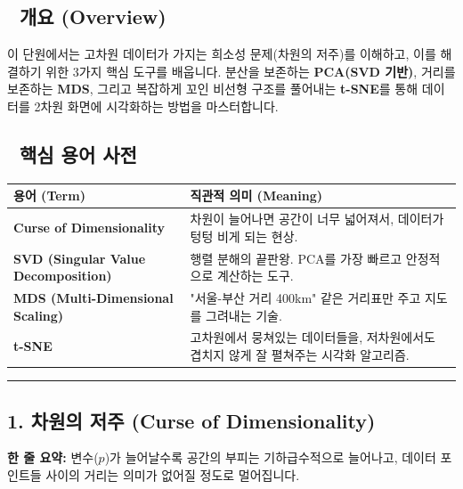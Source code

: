 \documentclass[11pt,a4paper]{book}
\theoremstyle{definition}
\begin{document}
\subsection*{📌 개요 (Overview)}
이 단원에서는 고차원 데이터가 가지는 희소성 문제(차원의 저주)를 이해하고, 이를 해결하기 위한 3가지 핵심 도구를 배웁니다. 분산을 보존하는 \textbf{PCA(SVD 기반)}, 거리를 보존하는 \textbf{MDS}, 그리고 복잡하게 꼬인 비선형 구조를 풀어내는 \textbf{t-SNE}를 통해 데이터를 2차원 화면에 시각화하는 방법을 마스터합니다.

\subsection*{📝 핵심 용어 사전}
\begin{table}[h]
\centering
\begin{tabularx}{\textwidth}{|p{}|X|}
\hline
\textbf{용어 (Term)} & \textbf{직관적 의미 (Meaning)} \\
\hline
\textbf{Curse of Dimensionality} & 차원이 늘어나면 공간이 너무 넓어져서, 데이터가 텅텅 비게 되는 현상. \\
\hline
\textbf{SVD (Singular Value Decomposition)} & 행렬 분해의 끝판왕. PCA를 가장 빠르고 안정적으로 계산하는 도구. \\
\hline
\textbf{MDS (Multi-Dimensional Scaling)} & "서울-부산 거리 400km" 같은 거리표만 주고 지도를 그려내는 기술. \\
\hline
\textbf{t-SNE} & 고차원에서 뭉쳐있는 데이터들을, 저차원에서도 겹치지 않게 잘 펼쳐주는 시각화 알고리즘. \\
\hline
\end{tabularx}
\end{table}

\vspace{0.5cm}\hrule\vspace{0.5cm}

\subsection{1. 차원의 저주 (Curse of Dimensionality)}

\begin{conceptbox}[title={개념 1: 사막에서 바늘 찾기}]
\textbf{한 줄 요약:} 변수($p$)가 늘어날수록 공간의 부피는 기하급수적으로 늘어나고, 데이터 포인트들 사이의 거리는 의미가 없어질 정도로 멀어집니다.
\end{conceptbox}
\end{document}
